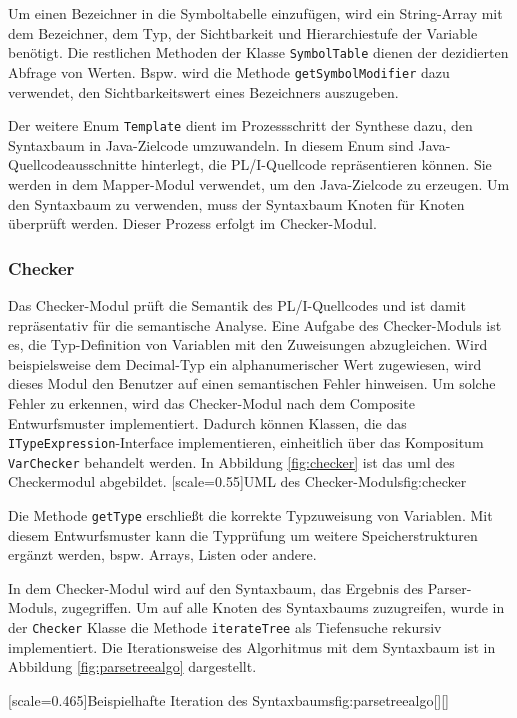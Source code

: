Um einen Bezeichner in die Symboltabelle einzufügen, wird ein String-Array mit dem Bezeichner, dem Typ, der Sichtbarkeit und Hierarchiestufe der Variable benötigt. Die restlichen Methoden der Klasse \verb+SymbolTable+ dienen der dezidierten Abfrage von Werten. Bspw. wird die Methode \verb+getSymbolModifier+ dazu verwendet, den Sichtbarkeitswert eines Bezeichners auszugeben.

Der weitere Enum \verb+Template+ dient im Prozessschritt der Synthese dazu, den Syntaxbaum in Java-Zielcode umzuwandeln.
In diesem Enum sind Java-Quellcodeausschnitte hinterlegt, die PL/I-Quellcode repräsentieren können. Sie werden in dem Mapper-Modul verwendet, um den Java-Zielcode zu erzeugen.
Um den Syntaxbaum zu verwenden, muss der Syntaxbaum Knoten für Knoten überprüft werden. Dieser Prozess erfolgt im Checker-Modul.
 
\subsubsection{Checker}
Das Checker-Modul prüft die Semantik des PL/I-Quellcodes und ist damit repräsentativ für die semantische Analyse. 
Eine Aufgabe des Checker-Moduls ist es, die Typ-Definition von Variablen mit den Zuweisungen abzugleichen.
Wird beispielsweise dem Decimal-Typ ein alphanumerischer Wert zugewiesen, wird dieses Modul den Benutzer auf einen semantischen Fehler hinweisen. Um solche Fehler zu erkennen, wird das Checker-Modul nach dem Composite Entwurfsmuster implementiert. Dadurch können Klassen, die das \verb+ITypeExpression+-Interface implementieren, einheitlich über das Kompositum \verb+VarChecker+ behandelt werden.
In Abbildung \ref{fig:checker} ist das \ac{uml} des Checkermodul abgebildet.
\pagebreak
{}[scale=0.55]{UML des Checker-Moduls}{fig:checker}

Die Methode \verb+getType+ erschließt die korrekte Typzuweisung von Variablen. Mit diesem Entwurfsmuster kann die Typprüfung um weitere Speicherstrukturen ergänzt werden, bspw. Arrays, Listen oder andere.

In dem Checker-Modul wird auf den Syntaxbaum, das Ergebnis des Parser-Moduls, zugegriffen.
Um auf alle Knoten des Syntaxbaums zuzugreifen, wurde in der \verb+Checker+ Klasse die Methode \verb+iterateTree+ als Tiefensuche rekursiv implementiert.
Die Iterationsweise des Algorhitmus mit dem Syntaxbaum ist in Abbildung \ref{fig:parsetreealgo} dargestellt.

[scale=0.465]{Beispielhafte Iteration des Syntaxbaums}{fig:parsetreealgo}[][]

